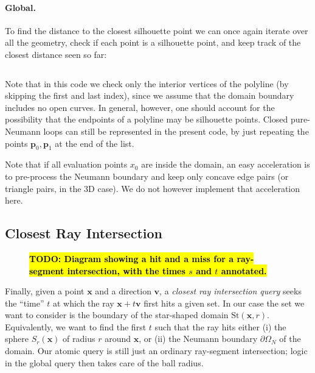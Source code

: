 \documentclass{article}
\newcommand{\todo}[1]{\textbf{\hl{TODO: #1}}}
\newcommand{\St}{\text{St}}
\renewcommand{\vec}[1]{\textbf{#1}}
\begin{document}
\paragraph{Global.} To find the distance to the closest silhouette point we can once again iterate over all the geometry, check if each point is a silhouette point, and keep track of the closest distance seen so far:

\inputminted[fontsize=\small,linenos,firstline=77,lastline=88,bgcolor=bg]{cpp}{../code/WoStLaplace2D.cpp}
Note that in this code we check only the interior vertices of the polyline (by skipping the first and last index), since we assume that the domain boundary includes no open curves.  In general, however, one should account for the possibility that the endpoints of a polyline may be silhouette points.  Closed pure-Neumann loops can still be represented in the present code, by just repeating the points \(\vec{p}_0, \vec{p}_1\) at the end of the list.

Note that if all evaluation points \(x_0\) are inside the domain, an easy acceleration is to pre-process the Neumann boundary and keep only concave edge pairs (or triangle pairs, in the 3D case).  We do not however implement that acceleration here.

\subsection{Closest Ray Intersection}
\label{sec:ClosestRayIntersection}

\begin{figure}[h!]
   \todo{Diagram showing a hit and a miss for a ray-segment intersection, with the times $s$ and $t$ annotated.}
   \label{fig:RayIntersectionExample}
\end{figure}

Finally, given a point \(\vec{x}\) and a direction \(\vec{v}\), a \emph{closest ray intersection query} seeks the ``time'' \(t\) at which the ray \(\vec{x} + t\vec{v}\) first hits a given set.  In our case the set we want to consider is the boundary of the star-shaped domain \(\St(\vec{x},r)\).  Equivalently, we want to find the first \(t\) such that the ray hits either (i) the sphere \(S_r(\vec{x})\) of radius \(r\) around \(\vec{x}\), or (ii) the Neumann boundary \(\partial\Omega_N\) of the domain.  Our atomic query is still just an ordinary ray-segment intersection; logic in the global query then takes care of the ball radius.
\end{document}
